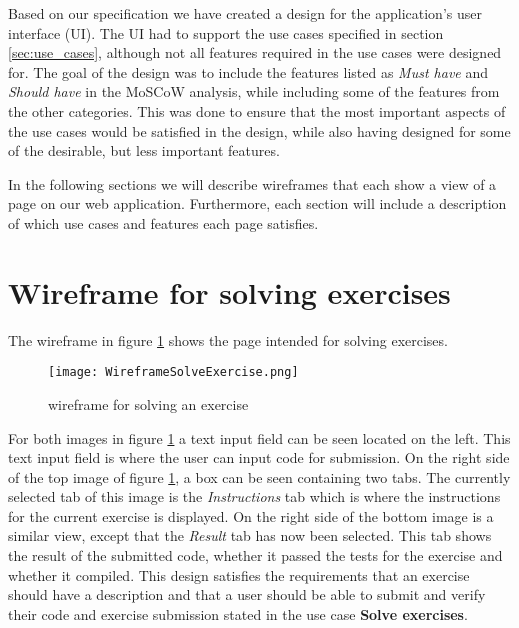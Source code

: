 Based on our specification we have created a design for the application's user interface (UI). The UI had to support the use cases specified in section \ref*{sec:use_cases}, although not all features required in the use cases were designed for. The goal of the design was to include the features listed as \textit{Must have} and \textit{Should have} in the MoSCoW analysis, while including some of the features from the other categories. This was done to ensure that the most important aspects of the use cases would be satisfied in the design, while also having designed for some of the desirable, but less important features.

In the following sections we will describe wireframes that each show a view of a page on our web application. Furthermore, each section will include a description of which use cases and features each page satisfies. 

\section{Wireframe for solving exercises}
The wireframe in figure \ref{fig:wfExercise} shows the page intended for solving exercises.
\begin{figure}[H]
	\texttt{[image: WireframeSolveExercise.png]}
	\centering
	\caption{wireframe for solving an exercise}
	\label{fig:wfExercise}
\end{figure}

For both images in figure \ref{fig:wfExercise} a text input field can be seen located on the left. This text input field is where the user can input code for submission. On the right side of the top image of figure \ref{fig:wfExercise}, a box can be seen containing two tabs. The currently selected tab of this image is the \textit{Instructions} tab which is where the instructions for the current exercise is displayed. On the right side of the bottom image is a similar view, except that the \textit{Result} tab has now been selected. This tab shows the result of the submitted code, whether it passed the tests for the exercise and whether it compiled. This design satisfies the requirements that an exercise should have a description and that a user should be able to submit and verify their code and exercise submission stated in the use case \textbf{Solve exercises}.

